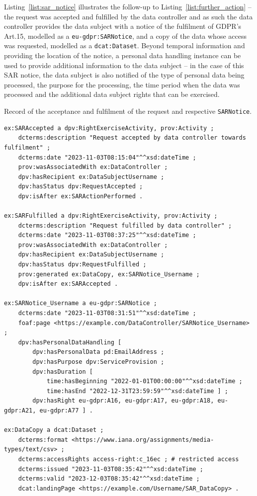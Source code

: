 
Listing~\ref{list:sar_notice} illustrates the follow-up to Listing~\ref{list:further_action} -- the request was accepted and fulfilled by the data controller and as such the data controller provides the data subject with a notice of the fulfilment of GDPR's Art.15, modelled as a \texttt{eu-gdpr:SARNotice}, and a copy of the data whose access was requested, modelled as a \texttt{dcat:Dataset}.
Beyond temporal information and providing the location of the notice, a personal data handling instance can be used to provide additional information to the data subject -- in the case of this SAR notice, the data subject is also notified of the type of personal data being processed, the purpose for the processing, the time period when the data was processed and the additional data subject rights that can be exercised.

\begin{listing}[htp]
\caption{Record of the acceptance and fulfilment of the request and respective \texttt{SARNotice}.}
\label{list:sar_notice}
\begin{verbatim}
ex:SARAccepted a dpv:RightExerciseActivity, prov:Activity ;
    dcterms:description "Request accepted by data controller towards fulfilment" ;
    dcterms:date "2023-11-03T08:15:04"^^xsd:dateTime ;
    prov:wasAssociatedWith ex:DataController ;
    dpv:hasRecipient ex:DataSubjectUsername ;
    dpv:hasStatus dpv:RequestAccepted ;
    dpv:isAfter ex:SARActionPerformed .

ex:SARFulfilled a dpv:RightExerciseActivity, prov:Activity ;
    dcterms:description "Request fulfilled by data controller" ;
    dcterms:date "2023-11-03T08:37:25"^^xsd:dateTime ;
    prov:wasAssociatedWith ex:DataController ;
    dpv:hasRecipient ex:DataSubjectUsername ;
    dpv:hasStatus dpv:RequestFulfilled ;
    prov:generated ex:DataCopy, ex:SARNotice_Username ;
    dpv:isAfter ex:SARAccepted .

ex:SARNotice_Username a eu-gdpr:SARNotice ;
    dcterms:date "2023-11-03T08:31:51"^^xsd:dateTime ;
    foaf:page <https://example.com/DataController/SARNotice_Username> ;
    dpv:hasPersonalDataHandling [
        dpv:hasPersonalData pd:EmailAddress ;
        dpv:hasPurpose dpv:ServiceProvision ;
        dpv:hasDuration [
            time:hasBeginning "2022-01-01T00:00:00"^^xsd:dateTime ;
            time:hasEnd "2022-12-31T23:59:59"^^xsd:dateTime ] ;
        dpv:hasRight eu-gdpr:A16, eu-gdpr:A17, eu-gdpr:A18, eu-gdpr:A21, eu-gdpr:A77 ] .

ex:DataCopy a dcat:Dataset ;
    dcterms:format <https://www.iana.org/assignments/media-types/text/csv> ;
    dcterms:accessRights access-right:c_16ec ; # restricted access
    dcterms:issued "2023-11-03T08:35:42"^^xsd:dateTime ;
    dcterms:valid "2023-12-03T08:35:42"^^xsd:dateTime ;
    dcat:landingPage <https://example.com/Username/SAR_DataCopy> .
\end{verbatim}
\end{listing}

